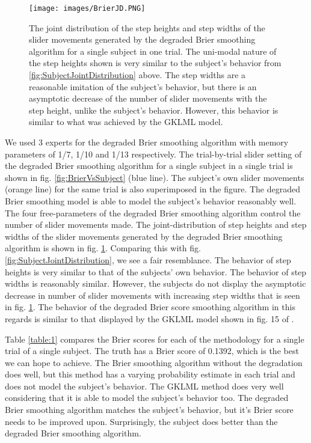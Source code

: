 \documentclass{article}
\begin{document}
\begin{figure}
	\texttt{[image: images/BrierJD.PNG]}
	\caption{The joint distribution of the step heights and step widths of the slider movements generated by the degraded Brier smoothing algorithm for a single subject in one trial. The uni-modal nature of the step heights shown is very similar to the subject's behavior from  \ref{fig:SubjectJointDistribution}  above. The step widths are a reasonable imitation of the subject's behavior, but there is an asymptotic decrease of the number of slider movements with the step height, unlike the subject's behavior. However, this behavior is similar to what was achieved by the GKLML model. }
	\label{fig:brierJd}
\end{figure}

We used 3 experts for the degraded Brier smoothing algorithm with memory parameters of 1/7, 1/10 and 1/13 respectively. The trial-by-trial slider setting of the degraded Brier smoothing algorithm for a single subject in a single trial is shown in fig. \ref{fig:BrierVsSubject} (blue line). The subject's own slider movements (orange line) for the same trial is also superimposed in the figure. The degraded Brier smoothing model is able to model the subject's behavior reasonably well. The four free-parameters of the degraded Brier smoothing algorithm control the number of slider movements made. The joint-distribution of step heights and step widths of the slider movements generated by the degraded Brier smoothing algorithm is shown in fig. \ref{fig:brierJd}. Comparing this with fig. \ref{fig:SubjectJointDistribution}, we see a fair resemblance. The behavior of step heights is very similar to that of the subjects' own behavior. The behavior of step widths is reasonably similar. However, the subjects do not display the asymptotic decrease in number of slider movements with increasing step widths that is seen in fig. \ref{fig:brierJd}. The behavior of the degraded Brier score smoothing algorithm in this regards is similar to that displayed by the GKLML model shown in fig. 15 of \cite{gallistel2014perception}.

Table  \ref{table:1} compares the Brier scores for each of the methodology for a single trial of a single subject. The truth has a Brier score of 0.1392, which is the best we can hope to achieve. The Brier smoothing algorithm without the degradation does well, but this method has a varying probability estimate in each trial and does not model the subject's behavior. The GKLML method does very well considering that it is able to model the subject's behavior too. The degraded Brier smoothing algorithm matches the subject's behavior, but it's Brier score needs to be improved upon. Surprisingly, the subject does better than the degraded Brier smoothing algorithm.
\end{document}
